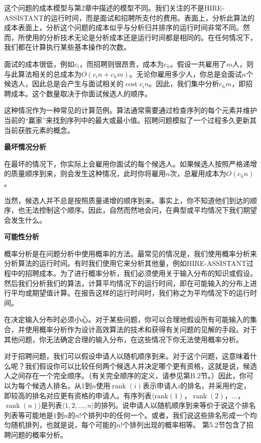 \documentclass[lang=cn,newtx,10pt,scheme=chinese]{elegantbook}
\begin{document}
这个问题的成本模型与第2章中描述的模型不同。我们关注的不是HIRE-ASSISTANT的运行时间，而是面试和招聘所支付的费用。表面上，分析此算法的成本表面上，分析这个问题的成本似乎与分析归并排序的运行时间非常不同。然而，所使用的分析技术无论是分析成本还是运行时间都是相同的。在任何情况下，我们都在计算执行某些基本操作的次数。

面试的成本很低，例如$c_i$，而招聘则很昂贵，成本为$c_h$。假设一共雇用了$m$人，则与此算法相关的总成本为$O\left(c_i n+c_h m\right)$。无论你雇用多少人，你总是会面试$n$个候选人，因此总是会产生与面试相关的$\operatorname{cost} c_i n$。因此，我们集中分析$c_h m$，即招聘成本。这个数量取决于你面试候选人的顺序。

这种情况作为一种常见的计算范例。算法通常需要通过检查序列的每个元素并维护当前的“赢家”来找到序列中的最大或最小值。招聘问题模拟了一个过程多久更新其当前获胜元素的概念。

\textbf{最坏情况分析}

在最坏的情况下，你实际上会雇用你面试的每个候选人。如果候选人按照严格递增的质量顺序到来，则会发生这种情况，此时你将雇用$n$次，总雇用成本为$O\left(c_h n\right)$。

当然，候选人并不总是按照质量递增的顺序到来。事实上，你不知道他们到达的顺序，也无法控制这个顺序。因此，自然而然地会问，在典型或平均情况下我们期望会发生什么。

\textbf{可能性分析}

概率分析是在问题分析中使用概率的方法。最常见的情况是，我们使用概率分析来分析算法的运行时间。有时我们使用它来分析其他量，例如HIRE-ASSISTANT过程中的招聘成本。为了进行概率分析，我们必须使用关于输入分布的知识或假设。然后我们分析我们的算法，计算平均情况下的运行时间，即在可能输入的分布上进行平均或期望值计算。在报告这样的运行时间时，我们称之为平均情况下的运行时间。

在决定输入分布时必须小心。对于某些问题，你可以合理地假设所有可能输入的集合，并使用概率分析作为设计高效算法的技术和获得有关问题的见解的手段。对于其他问题，你无法确定合理的输入分布，在这些情况下你无法使用概率分析。

对于招聘问题，我们可以假设申请人以随机顺序到来。对于这个问题，这意味着什么呢？我们假设你可以比较任何两个候选人并决定哪个更有资格，这就是说，候选人之间存在一个完全顺序。（有关完全顺序的定义，请参见第B.2节。）因此，你可以为每个候选人排名，从1到$n$使用$\operatorname{rank}(i)$表示申请人$i$的排名，并采用约定，即较高的排名对应更有资格的申请人。有序列表$\langle\operatorname{rank(1)}$，$\operatorname{rank}(2)$，$\ldots$，$\operatorname{rank}(n)\rangle$是列表$\langle 1,2,\ldots,n\rangle$的排列。说申请人以随机顺序到来等价于说这个排名列表等可能地是$1$到$n$的$n$!个排列中的任何一个。或者，我们说这些排名形成一个均匀随机排列，也就是说，每个可能的$n$!个排列出现的概率相等。
第5.2节包含了招聘问题的概率分析。
\end{document}
